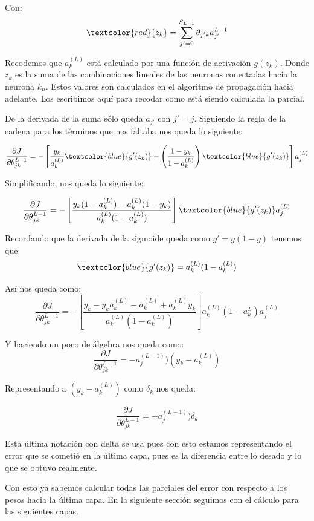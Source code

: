 Con:
\begin{equation}
 \textcolor{red}{z_{k}} = \sum_{j'=0}^{S_{L-1}} \theta_{j'k}a_{j'}^{L-1}
\end{equation}

Recodemos que $a_{k}^{(L)}$ está calculado por una función de activación $g(z_{k})$. Donde $z_{k}$ es la suma de las combinaciones lineales de las neuronas conectadas hacia la neurona $k_{n}$. Estos valores son calculados en el algoritmo de propagación hacia adelante. Los escribimos aquí para recodar como está siendo calculada la parcial.

De la derivada de la suma sólo queda $a_{j'} $ con $j' = j$. Siguiendo la regla de la cadena para los términos que nos faltaba nos queda lo siguiente:

\begin{equation}
 \dfrac{\partial J}{\partial \theta_{jk}^{L-1}} =-\left[ \dfrac{y_{k}}{a_{k}^{(L)}} \textcolor{blue}{g'(z_{k})} -\left( \dfrac{1-y_{k}}{1-a_{k}^{(L)}} \right) \textcolor{blue}{g'(z_{k})}\right]a_{j}^{(L)}
\end{equation}

Simplificando, nos queda lo siguiente:

\begin{equation}
 \dfrac{\partial J}{\partial \theta_{jk}^{L-1}} =-\left[ \dfrac{y_{k}(1-a_{k}^{(L)})-a_{k}^{(L)}(1-y_{k})} {a_{k}^{(L)}(1-a_{k}^{(L)})} \right]\textcolor{blue}{g'(z_{k})} a_{j}^{(L)}
\end{equation}

Recordando que la derivada de la sigmoide queda como $g' = g (1 - g)$ tenemos que:
\begin{equation}
 \textcolor{blue}{g'(z_{k})} = a_{k}^{(L)}(1-a_{k}^{(L)})
\end{equation}

Así nos queda como: 
\begin{equation}
 \dfrac{\partial J}{\partial \theta_{jk}^{L-1}} = -\left[ \dfrac{y_{k}- y_{k}a_{k}^{(L)} - a_{k}^{(L)} + a_{k}^{(L)}y_{k} } {a_{k}^{(L)}(1-a_{k}^{(L)})} \right] a_{k}^{(L)}(1-a_{k}^{L}) a_{j}^{(L)}
\end{equation}

Y haciendo un poco de álgebra nos queda como:
\begin{equation}
 \dfrac{\partial J}{\partial \theta_{jk}^{L-1}} =  -a_{j}^{(L-1)})(y_{k}-a_{k}^{(L)})
\end{equation}

Representando a $(y_{k}-a_{k}^{(L)})$ como $\delta_{k}$ nos queda:

\begin{equation}
 \dfrac{\partial J}{\partial \theta_{jk}^{L-1}} =-a_{j}^{(L-1)})\delta_{k}
\end{equation}

Esta última notación con delta se usa pues con esto estamos representando el error que se cometió en la última capa, pues es la diferencia entre lo desado y lo que se obtuvo realmente.

Con esto ya sabemos calcular todas las parciales del error con respecto a los pesos hacia la última capa. En la siguiente sección seguimos con el cálculo para las siguientes capas.
